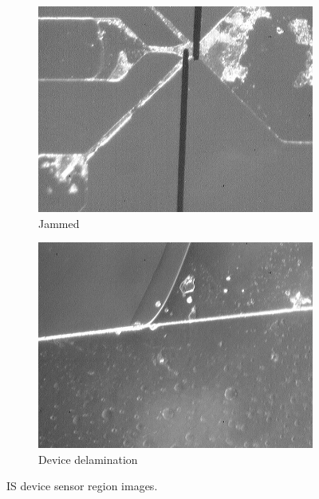 \begin{figure}[h]
    \begin{subfigure}[b]{0.45\textwidth}
        \centering
        \includegraphics[width=\textwidth]{images/IS_jammed.jpg}
        \caption{Jammed}
    \end{subfigure}
    \hfill
    \begin{subfigure}[b]{0.45\textwidth}
        \centering
        \includegraphics[width=\textwidth]{images/IS_device_delamination.jpg}
        \caption{Device delamination}
    \end{subfigure}
    \caption{IS device sensor region images.}
    \label{fig:IS_sensor_reigon_measurement}
\end{figure}

